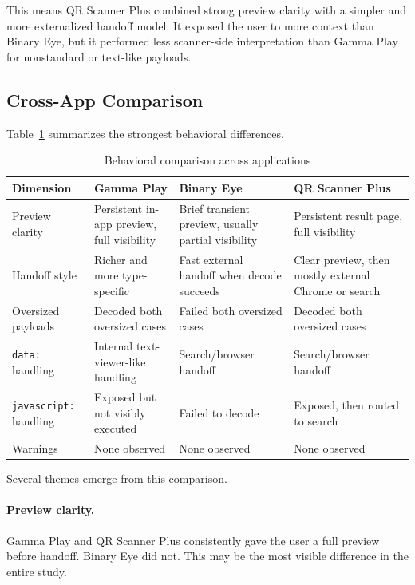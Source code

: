 \documentclass[11pt]{article}
\begin{document}
This means QR Scanner Plus combined strong preview clarity with a simpler and more externalized handoff model. It exposed the user to more context than Binary Eye, but it performed less scanner-side interpretation than Gamma Play for nonstandard or text-like payloads.

\subsection{Cross-App Comparison}

Table~\ref{tab:behavior} summarizes the strongest behavioral differences.

\begin{table}[H]
\centering
\caption{Behavioral comparison across applications}
\label{tab:behavior}
\begin{tabularx}{\textwidth}{>{\raggedright\arraybackslash}p{2.8cm} >{\raggedright\arraybackslash}X >{\raggedright\arraybackslash}X >{\raggedright\arraybackslash}X}
\toprule
\textbf{Dimension} & \textbf{Gamma Play} & \textbf{Binary Eye} & \textbf{QR Scanner Plus} \\
\midrule
Preview clarity & Persistent in-app preview, full visibility & Brief transient preview, usually partial visibility & Persistent result page, full visibility \\
Handoff style & Richer and more type-specific & Fast external handoff when decode succeeds & Clear preview, then mostly external Chrome or search \\
Oversized payloads & Decoded both oversized cases & Failed both oversized cases & Decoded both oversized cases \\
\texttt{data:} handling & Internal text-viewer-like handling & Search/browser handoff & Search/browser handoff \\
\texttt{javascript:} handling & Exposed but not visibly executed & Failed to decode & Exposed, then routed to search \\
Warnings & None observed & None observed & None observed \\
\bottomrule
\end{tabularx}
\end{table}

Several themes emerge from this comparison.

\paragraph{Preview clarity.}
Gamma Play and QR Scanner Plus consistently gave the user a full preview before handoff. Binary Eye did not. This may be the most visible difference in the entire study.
\end{document}
